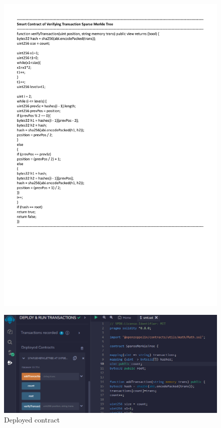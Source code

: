\begin{figure}[H]
    \centering
    \includegraphics[scale=0.65]{figures/verifying smt solidity.pdf}
 
\end{figure}

\begin{figure}[H]
    \centering
    \includegraphics[scale=0.5]{figures/dep contract.png}
    \caption{Deployed contract}
 
\end{figure}



